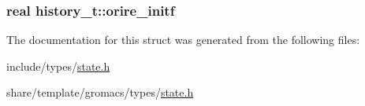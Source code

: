 \hypertarget{structhistory__t_a6047d3a9ba6318f77225bb5da2c92b40}{
\subsubsection[{orire\-\_\-initf}]{\setlength{\rightskip}{0pt plus 5cm}real {\bf history\-\_\-t\-::orire\-\_\-initf}}}\label{structhistory__t_a6047d3a9ba6318f77225bb5da2c92b40}


\-The documentation for this struct was generated from the following files\-:\begin{DoxyCompactItemize}
\item 
include/types/\hyperlink{include_2types_2state_8h}{state.\-h}\item 
share/template/gromacs/types/\hyperlink{share_2template_2gromacs_2types_2state_8h}{state.\-h}\end{DoxyCompactItemize}
